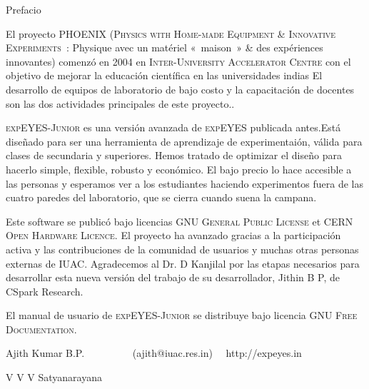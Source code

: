 \documentclass[12pt,a4paper]{report}
\begin{document}
\thispagestyle{empty}

Prefacio

El proyecto PHOENIX (\textsc{Physics with Home-made Equipment \& Innovative
Experiments}~: Physique avec un matériel «~maison~» \& des expériences
innovantes) comenzó en 2004 en \textsc{Inter-University Accelerator
Centre} con el objetivo de mejorar la educación científica en las 
universidades indias El desarrollo de equipos de laboratorio 
de bajo costo y la capacitación de docentes son las dos actividades 
principales de este proyecto..

\textsc{expEYES-Junior} es una versión avanzada de \textsc{expEYES} publicada
antes.Está diseñado para ser una herramienta de aprendizaje de experimentaión, 
válida para clases de secundaria y superiores. Hemos tratado de optimizar el 
diseño para hacerlo simple, flexible, robusto y económico.
El bajo precio lo hace accesible a las personas y esperamos ver a los estudiantes 
haciendo experimentos fuera de las cuatro paredes del laboratorio, que se cierra 
cuando suena la campana.

Este software se publicó bajo licencias \textsc{GNU General Public
License} et \textsc{CERN Open Hardware Licence}. El proyecto ha avanzado 
gracias a la participación activa y las contribuciones de la comunidad de usuarios 
y muchas otras personas externas de \textsc{IUAC}.
Agradecemos al Dr. D Kanjilal por las etapas necesarios para desarrollar 
esta nueva versión del trabajo de su desarrollador, Jithin B P, de CSpark Research.

El manual de usuario de \textsc{expEYES-Junior} se distribuye bajo 
licencia \textsc{GNU Free Documentation}.

Ajith Kumar B.P. ~~~~~~~~~(ajith@iuac.res.in) ~~http://expeyes.in

V V V Satyanarayana
\end{document}
